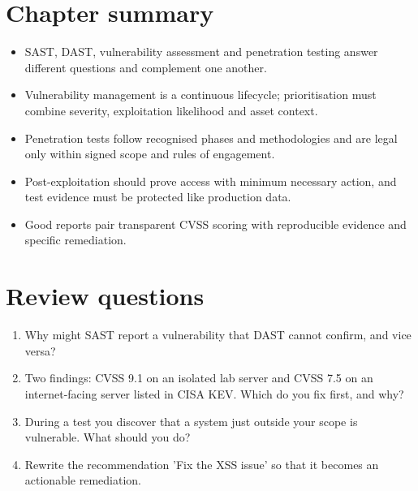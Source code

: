 \section*{Chapter summary}
\begin{itemize}
  \item SAST, DAST, vulnerability assessment and penetration testing answer different questions and complement one another.
  \item Vulnerability management is a continuous lifecycle; prioritisation must combine severity, exploitation likelihood and asset context.
  \item Penetration tests follow recognised phases and methodologies and are legal only within signed scope and rules of engagement.
  \item Post-exploitation should prove access with minimum necessary action, and test evidence must be protected like production data.
  \item Good reports pair transparent CVSS scoring with reproducible evidence and specific remediation.
\end{itemize}

\section*{Review questions}
\begin{enumerate}
  \item Why might SAST report a vulnerability that DAST cannot confirm, and vice versa?
  \item Two findings: CVSS 9.1 on an isolated lab server and CVSS 7.5 on an internet-facing server listed in CISA KEV. Which do you fix first, and why?
  \item During a test you discover that a system just outside your scope is vulnerable. What should you do?
  \item Rewrite the recommendation 'Fix the XSS issue' so that it becomes an actionable remediation.
\end{enumerate}
